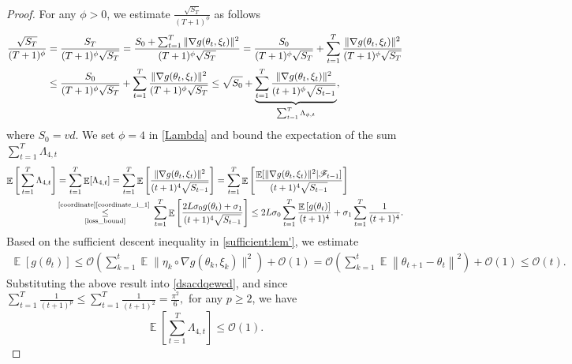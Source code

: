 \documentclass[standalone]{article}
\DeclareMathOperator{\Expect}{\mathbb{E}}
\begin{document}
\begin{proof}
For any $\phi > 0$, we estimate $\frac{\sqrt{S_{T}}}{(T+1)^{\phi}}$ as follows
\begin{align}\label{Lambda}
\frac{\sqrt{S_{T}}}{(T+1)^{\phi}}&=\frac{{S_{T}}}{(T+1)^{\phi}\sqrt{S_{T}}}=\frac{S_{0}+\sum_{t=1}^{T}\|\nabla g(\theta_{t},\xi_{t})\|^{2}}{(T+1)^{\phi}\sqrt{S_{T}}} =\frac{S_{0}}{(T+1)^{\phi}\sqrt{S_{T}}} +\sum_{t=1}^{T}\frac{\|\nabla g(\theta_{t},\xi_{t})\|^{2}}{(T+1)^{\phi}\sqrt{S_{T}}} \notag  \\&\le \frac{S_{0}}{(T+1)^{\phi}\sqrt{S_{T}}} +\sum_{t=1}^{T}\frac{\|\nabla g(\theta_{t},\xi_{t})\|^{2}}{(T+1)^{\phi}\sqrt{S_{T}}}\le {\sqrt{S_{0}}}+\underbrace{\sum_{t=1}^{T}\frac{\|\nabla g(\theta_{t},\xi_{t})\|^{2}}{(t+1)^{\phi}\sqrt{S_{t-1}}}}_{\sum_{t=1}^{T}\Lambda_{\phi,t}},
\end{align}
where $S_0=vd$. We set $\phi = 4$ in \cref{Lambda} and bound the expectation of the sum $\sum_{t=1}^{T}\Lambda_{4,t}$
\begin{align}\label{dsacdqewed}
\Expect\Bigg[\sum_{t=1}^{T}\Lambda_{4,t}\Bigg]&=\sum_{t=1}^{T}\Expect[\Lambda_{4,t}]=\sum_{t=1}^{T}\Expect\Bigg[\frac{\|\nabla g(\theta_{t},\xi_{t})\|^{2}}{(t+1)^{4}\sqrt{S_{t-1}}}\Bigg]=\sum_{t=1}^{T}\Expect\Bigg[\frac{\Expect[\|\nabla g(\theta_{t},\xi_{t})\|^{2}|\mathscr{F}_{t-1}]}{(t+1)^{4}\sqrt{S_{t-1}}}\Bigg]\notag\\&\mathop{\le}_{\text{\cref{loss_bound}}}^{\text{\cref{coordinate}\ref{coordinate_i_1} }}\sum_{t=1}^{T}\Expect\Bigg[\frac{2 L\sigma_{0}g(\theta_{t})+\sigma_{1}}{(t+1)^{4}\sqrt{S_{t-1}}}\Bigg]\le 2 L\sigma_{0}\sum_{t=1}^{T}\frac{\Expect\left[g(\theta_{t})\right]}{(t+1)^{4}}+\sigma_{1}\sum_{t=1}^{T}\frac{1}{(t+1)^{4}}.
\end{align}
Based on the sufficient descent inequality  in \cref{sufficient:lem'}, we estimate 
\begin{align*}
\Expect\left[g(\theta_{t})\right] \leq \mathcal{O}\left(\sum_{k=1}^{t}\Expect\|\eta_{k}\circ \nabla g(\theta_{k},\xi_{k})\|^{2}\right)+\mathcal{O}(1) = \mathcal{O}\left(\sum_{k=1}^{t}\Expect \left\| \theta_{t+1} - \theta_t \right\|^2\right)+\mathcal{O}(1) \leq \mathcal{O}(t).
\end{align*}
Substituting the above result into \cref{dsacdqewed}, and since $\sum_{t=1}^{T}\frac{1}{(t+1)^{p}}\le\sum_{t=1}^{T}\frac{1}{(t+1)^{2}}=\frac{\pi^{2}}{6},$ for any $p \geq 2$, we have
\[\Expect\left[\sum_{t=1}^{T}\Lambda_{4,t}\right] \leq \mathcal{O}(1).\]

\end{proof}
\end{document}
